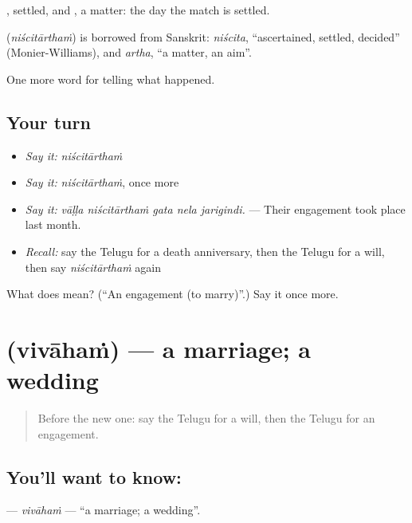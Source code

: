 , settled, and , a matter: the day the match is settled.

\begin{cousinweb}
\textbf{} (\emph{niścitārthaṁ}) is borrowed from Sanskrit: \emph{niścita}, \textquotedblleft{}ascertained, settled, decided\textquotedblright{} (Monier-Williams), and \emph{artha}, \textquotedblleft{}a matter, an aim\textquotedblright{}.
\end{cousinweb}

\begin{grammarlens}[title={What you've built}]
One more word for telling what happened.
\end{grammarlens}

\subsection*{Your turn}
\begin{itemize}
\raggedright
  \item \emph{Say it:} \emph{niścitārthaṁ}
  \item \emph{Say it:} \emph{niścitārthaṁ}, once more
  \item \emph{Say it:} \emph{vāḷḷa niścitārthaṁ gata nela jarigindi.} — Their engagement took place last month.
  \item \emph{Recall:} say the Telugu for a death anniversary, then the Telugu for a will, then say \emph{niścitārthaṁ} again
\end{itemize}

\begin{tcolorbox}[breakable,colback=teal!4,colframe=teal!35!black,title={Before you move on}]
What does  mean? (\textquotedblleft{}An engagement (to marry)\textquotedblright{}.) Say it once more.
\end{tcolorbox}
\section[\texorpdfstring{\te{వివాహం} (vivāhaṁ)}{వివాహం (vivāhaṁ)}]{ (vivāhaṁ) — a marriage; a wedding}

\label{lesson:TE-C346-vivaham}



\begin{quote}
Before the new one: say the Telugu for a will, then the Telugu for an engagement.
\end{quote}

\subsection*{You'll want to know: }
\textbf{} — \emph{vivāhaṁ} — \textquotedblleft{}a marriage; a wedding\textquotedblright{}.

